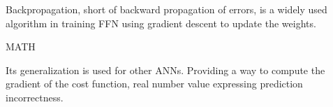 Backpropagation, short of backward propagation of errors, is a widely used algorithm in training FFN using gradient descent to update the weights. \cite{birlliantbackprop}

MATH

Its generalization is used for other ANNs. Providing a way to compute the gradient of the cost function,
 real number value expressing prediction incorrectness.\cite{Goodfellow-et-al-2016}
